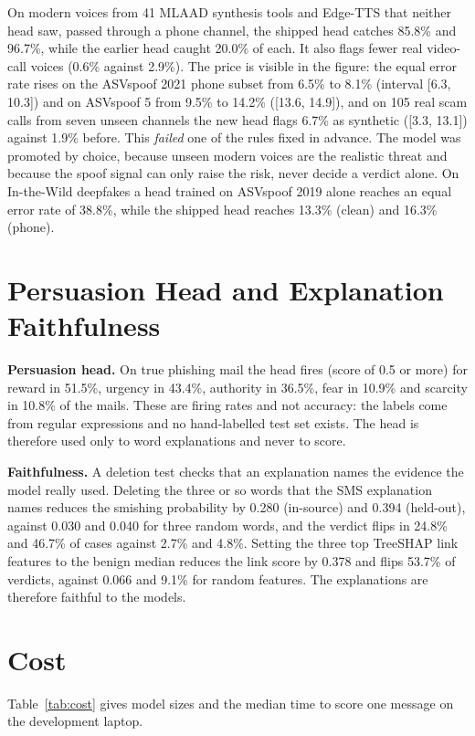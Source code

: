 {On modern voices from 41 MLAAD synthesis tools and Edge-TTS that neither head saw, passed through a phone channel, the shipped head catches 85.8\% and 96.7\%, while the earlier head caught 20.0\% of each. It also flags fewer real video-call voices (0.6\% against 2.9\%). The price is visible in the figure: the equal error rate rises on the ASVspoof 2021 phone subset from 6.5\% to 8.1\% (interval [6.3, 10.3]) and on ASVspoof 5 from 9.5\% to 14.2\% ([13.6, 14.9]), and on 105 real scam calls from seven unseen channels the new head flags 6.7\% as synthetic ([3.3, 13.1]) against 1.9\% before. This \emph{failed} one of the rules fixed in advance. The model was promoted by choice, because unseen modern voices are the realistic threat and because the spoof signal can only raise the risk, never decide a verdict alone. On In-the-Wild deepfakes a head trained on ASVspoof 2019 alone reaches an equal error rate of 38.8\%, while the shipped head reaches 13.3\% (clean) and 16.3\% (phone).

\section{Persuasion Head and Explanation Faithfulness}\label{sec:res-faith}
\textbf{Persuasion head.} On true phishing mail the head fires (score of 0.5 or more) for reward in 51.5\%, urgency in 43.4\%, authority in 36.5\%, fear in 10.9\% and scarcity in 10.8\% of the mails. These are firing rates and not accuracy: the labels come from regular expressions and no hand-labelled test set exists. The head is therefore used only to word explanations and never to score.

\textbf{Faithfulness.} A deletion test checks that an explanation names the evidence the model really used. Deleting the three or so words that the SMS explanation names reduces the smishing probability by 0.280 (in-source) and 0.394 (held-out), against 0.030 and 0.040 for three random words, and the verdict flips in 24.8\% and 46.7\% of cases against 2.7\% and 4.8\%. Setting the three top TreeSHAP link features to the benign median reduces the link score by 0.378 and flips 53.7\% of verdicts, against 0.066 and 9.1\% for random features. The explanations are therefore faithful to the models.

\section{Cost}\label{sec:res-cost}
Table~\ref{tab:cost} gives model sizes and the median time to score one message on the development laptop.

}
